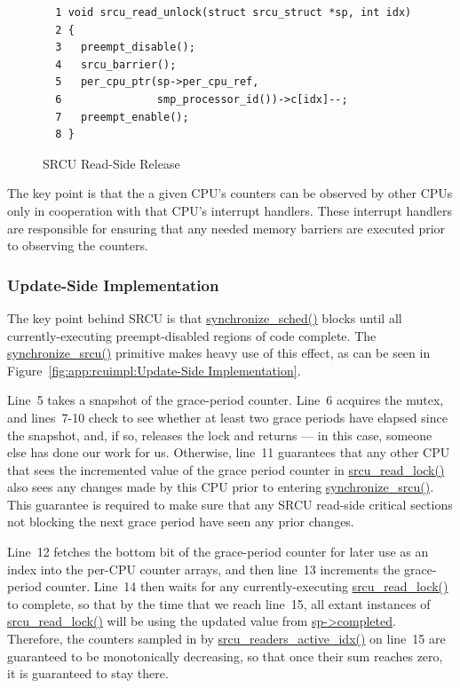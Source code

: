 \begin{figure}[htbp]
{ \scriptsize
\begin{verbatim}
  1 void srcu_read_unlock(struct srcu_struct *sp, int idx)
  2 {
  3   preempt_disable();
  4   srcu_barrier();
  5   per_cpu_ptr(sp->per_cpu_ref,
  6               smp_processor_id())->c[idx]--;
  7   preempt_enable();
  8 }
\end{verbatim}
}
\caption{SRCU Read-Side Release}
\label{fig:app:rcuimpl:Read-Side Release}
\end{figure}

The key point is that the a given CPU's counters
can be observed by other CPUs only in
cooperation with that CPU's interrupt handlers.
These interrupt handlers are responsible for ensuring that any needed
memory barriers are executed prior to observing the counters.

\subsubsection{Update-Side Implementation}
\label{sec:app:rcuimpl:Update-Side Implementation}

The key point behind SRCU is that \url{synchronize_sched()}
blocks until all currently-executing preempt-disabled regions of
code complete.
The \url{synchronize_srcu()} primitive makes heavy use of this effect,
as can be seen in
Figure~\ref{fig:app:rcuimpl:Update-Side Implementation}.

Line~5 takes a snapshot of the grace-period counter.
Line~6 acquires the mutex, and lines~7-10 check to see whether
at least two grace periods have elapsed since the snapshot,
and, if so, releases the lock and returns --- in this case, someone
else has done our work for us.
Otherwise, line~11 guarantees that any other CPU that sees the
incremented value of the grace period counter in \url{srcu_read_lock()}
also sees any changes made by this CPU prior to entering
\url{synchronize_srcu()}.
This guarantee is required to make sure that any SRCU read-side
critical sections not blocking the next grace period have seen
any prior changes.

Line~12 fetches the bottom bit of the grace-period counter for later
use as an index into the per-CPU counter arrays, and then line~13
increments the grace-period counter.
Line~14 then waits for any currently-executing \url{srcu_read_lock()}
to complete, so that by the time that we reach line~15, all
extant instances of \url{srcu_read_lock()} will be using the updated
value from \url{sp->completed}.
Therefore, the counters sampled in by \url{srcu_readers_active_idx()}
on line~15 are guaranteed to
be monotonically decreasing, so that once their sum reaches zero, it
is guaranteed to stay there.

